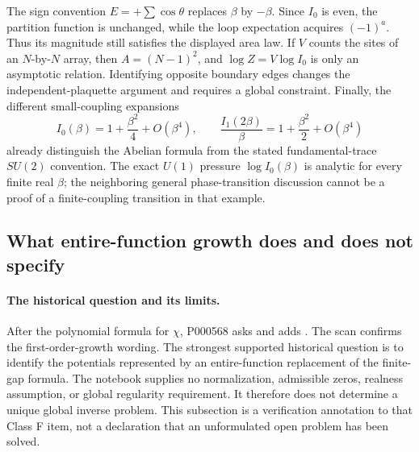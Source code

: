 \begin{remark}\leavevmode\par\noindent\ours\quad
The sign convention \(E=+\sum\cos\theta\) replaces \(\beta\) by \(-\beta\). Since \(I_0\) is even, the partition function is unchanged, while the loop expectation acquires \((-1)^a\). Thus its magnitude still satisfies the displayed area law. If \(V\) counts the sites of an \(N\)-by-\(N\) array, then \(A=(N-1)^2\), and \(\log Z=V\log I_0\) is only an asymptotic relation. Identifying opposite boundary edges changes the independent-plaquette argument and requires a global constraint. Finally, the different small-coupling expansions
\[
 I_0(\beta)=1+\frac{\beta^2}{4}+O(\beta^4),\qquad
 \frac{I_1(2\beta)}{\beta}=1+\frac{\beta^2}{2}+O(\beta^4)
\]
already distinguish the Abelian formula from the stated fundamental-trace \(SU(2)\) convention. The exact \(U(1)\) pressure \(\log I_0(\beta)\) is analytic for every finite real \(\beta\); the neighboring general phase-transition discussion cannot be a proof of a finite-coupling transition in that example.
\end{remark}


\subsection{What entire-function growth does and does not specify}
\label{audit:entire-data}

\paragraph{The historical question and its limits.}
After the polynomial formula for \(\chi\), P000568 asks
and adds . The scan confirms the first-order-growth
wording. The strongest supported historical question is to identify the potentials
represented by an entire-function replacement of the finite-gap formula. The
notebook supplies no normalization, admissible zeros, realness assumption, or
global regularity requirement. It therefore does not determine a unique global
inverse problem. This subsection is a verification annotation to that Class F
item, not a declaration that an unformulated open problem has been solved.

